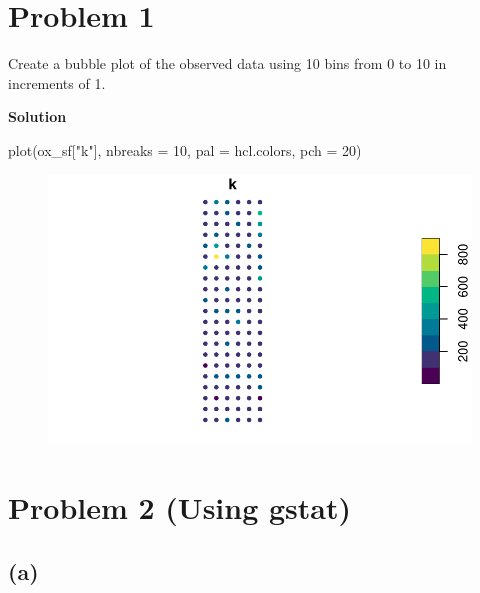 \documentclass[
  letterpaper,
  DIV=11,
  numbers=noendperiod]{scrartcl}
\newenvironment{Shaded}{\begin{snugshade}}{\end{snugshade}}
\newcommand{\AttributeTok}[1]{\textcolor[rgb]{0.40,0.45,0.13}{#1}}
\newcommand{\DecValTok}[1]{\textcolor[rgb]{0.68,0.00,0.00}{#1}}
\newcommand{\FunctionTok}[1]{\textcolor[rgb]{0.28,0.35,0.67}{#1}}
\newcommand{\NormalTok}[1]{\textcolor[rgb]{0.00,0.23,0.31}{#1}}
\newcommand{\StringTok}[1]{\textcolor[rgb]{0.13,0.47,0.30}{#1}}
\begin{document}
\hypertarget{problem-1}{%
\section{Problem 1}\label{problem-1}}

Create a bubble plot of the observed data using 10 bins from 0 to 10 in
increments of 1.

\textbf{Solution}

\begin{Shaded}
\begin{Highlighting}[]
\FunctionTok{plot}\NormalTok{(ox\_sf[}\StringTok{"k"}\NormalTok{], }\AttributeTok{nbreaks =} \DecValTok{10}\NormalTok{, }\AttributeTok{pal =}\NormalTok{ hcl.colors, }\AttributeTok{pch =} \DecValTok{20}\NormalTok{)}
\end{Highlighting}
\end{Shaded}

\begin{figure}[H]

{\centering \includegraphics{geo-hw-spdep_files/figure-pdf/unnamed-chunk-2-1.pdf}

}

\end{figure}

\hypertarget{problem-2-using-gstat}{%
\section{\texorpdfstring{Problem 2 (Using
\textbf{gstat})}{Problem 2 (Using gstat)}}\label{problem-2-using-gstat}}

\hypertarget{a}{%
\subsection{(a)}\label{a}}
\end{document}
